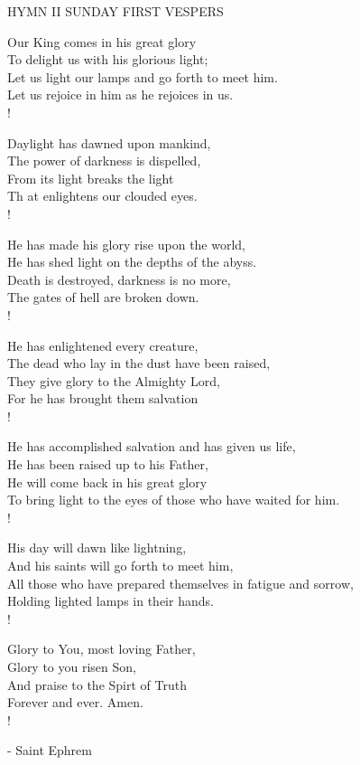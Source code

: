 \noindent\small{\uppercase{Hymn II SUNDAY First Vespers}}\normalsize\label{ordinaryTime:secondHymn}
\begin{cverse}
Our King comes in his great glory\\
To delight us with his glorious light;\\
Let us light our lamps and go forth to meet him.\\
Let us rejoice in him as he rejoices in us.\\!

Daylight has dawned upon mankind,\\
The power of darkness is dispelled,\\
From its light breaks the light\\
Th at enlightens our clouded eyes.\\!

He has made his glory rise upon the world,\\
He has shed light on the depths of the abyss.\\
Death is destroyed, darkness is no more,\\
The gates of hell are broken down.\\!

He has enlightened every creature,\\
The dead who lay in the dust have been raised,\\
They give glory to the Almighty Lord,\\
For he has brought them salvation\\!

He has accomplished salvation and has given us life,\\
He has been raised up to his Father,\\
He will come back in his great glory\\
To bring light to the eyes of those who have waited for him.\\!

His day will dawn like lightning,\\
And his saints will go forth to meet him,\\
All those who have prepared themselves in fatigue and sorrow,\\
Holding lighted lamps in their hands.\\!

Glory to You, most loving Father,\\
Glory to you risen Son,\\
And praise to the Spirt of Truth\\
Forever and ever. Amen.\\!
\end{cverse}
\begin{flushright}\tiny - Saint Ephrem\end{flushright}

